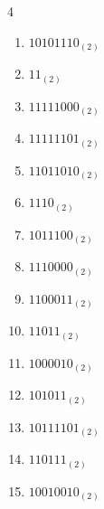 \begin{multicols}{4}
\begin{enumerate}
        \phantom{$=71$}

  \item $10101110_{(2)}$

        \phantom{$=174$}

\columnbreak %

  \item $11_{(2)}$

        \phantom{$=3$}

  \item $11111000_{(2)}$

        \phantom{$=248$}

  \item $11111101_{(2)}$

        \phantom{$=253$}

  \item $11011010_{(2)}$

        \phantom{$=218$}

  \item $1110_{(2)}$

        \phantom{$=14$}

  \item $1011100_{(2)}$

        \phantom{$=92$}

  \item $1110000_{(2)}$

        \phantom{$=112$}

  \item $1100011_{(2)}$

        \phantom{$=99$}

  \item $11011_{(2)}$

        \phantom{$=27$}

  \item $1000010_{(2)}$

        \phantom{$=66$}

  \item $101011_{(2)}$

        \phantom{$=43$}

  \item $10111101_{(2)}$

        \phantom{$=189$}

  \item $110111_{(2)}$

        \phantom{$=55$}

  \item $10010010_{(2)}$


\end{enumerate}
\end{multicols}
